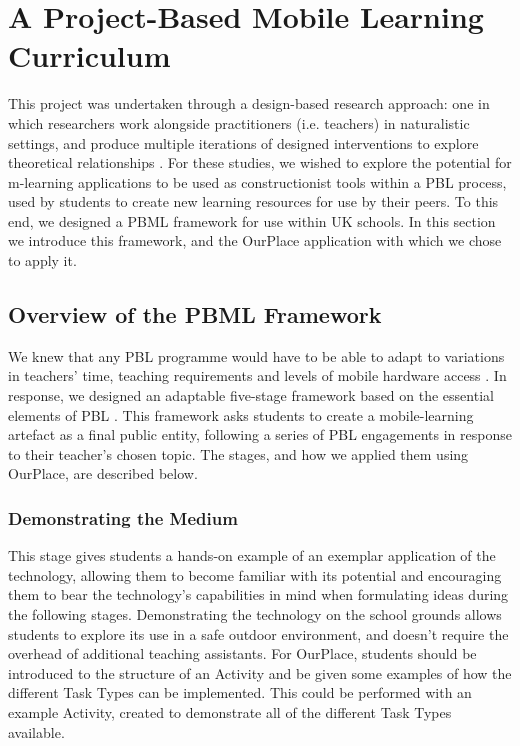 \section{A Project-Based Mobile Learning Curriculum}
This project was undertaken through a design-based research approach: one in which researchers work alongside practitioners (i.e. teachers) in naturalistic settings, and produce multiple iterations of designed interventions to explore theoretical relationships \cite{Barab2004}. For these studies, we wished to explore the potential for m-learning applications to be used as constructionist tools within a PBL process, used by students to create new learning resources for use by their peers. To this end, we designed a PBML framework for use within UK schools. In this section we introduce this framework, and the OurPlace application with which we chose to apply it.

\subsection{Overview of the PBML Framework}
We knew that any PBL programme would have to be able to adapt to variations in teachers' time, teaching requirements and levels of mobile hardware access \cite{Blumenfeld1991, Krajcik2006, InnovationUnit2016, TheEducationEndowmentFoundation2016}. In response, we designed an adaptable five-stage framework based on the essential elements of PBL \cite{Larmer2015}. This framework asks students to create a mobile-learning artefact as a final public entity, following a series of PBL engagements in response to their teacher's chosen topic. The stages, and how we applied them using OurPlace, are described below.

\subsubsection{Demonstrating the Medium}
This stage gives students a hands-on example of an exemplar application of the technology, allowing them to become familiar with its potential and encouraging them to bear the technology's capabilities in mind when formulating ideas during the following stages. Demonstrating the technology on the school grounds allows students to explore its use in a safe outdoor environment, and doesn't require the overhead of additional teaching assistants. For OurPlace, students should be introduced to the structure of an Activity and be given some examples of how the different Task Types can be implemented. This could be performed with an example Activity, created to demonstrate all of the different Task Types available.

